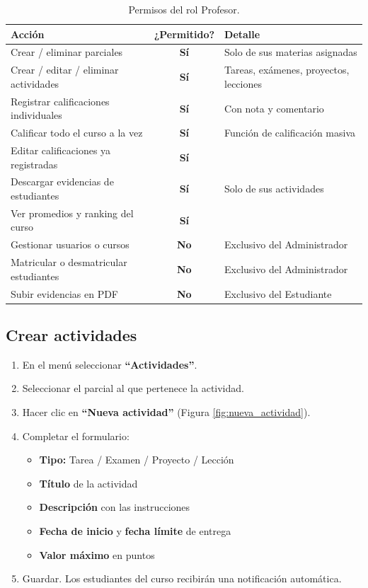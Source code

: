 \documentclass[12pt, a4paper]{article}
\newcommand{\puede}{\textcolor{yescolor}{\textbf{Sí}}}
\newcommand{\nopuede}{\textcolor{nocolor}{\textbf{No}}}
\begin{document}
\begin{table}[H]
    \centering
    \begin{tabular}{p{5.5cm} c p{6.5cm}}
        \toprule
        \textbf{Acción} & \textbf{¿Permitido?} & \textbf{Detalle} \\
        \midrule
        Crear / eliminar parciales             & \puede    & Solo de sus materias asignadas \\
        Crear / editar / eliminar actividades  & \puede    & Tareas, exámenes, proyectos, lecciones \\
        Registrar calificaciones individuales  & \puede    & Con nota y comentario \\
        Calificar todo el curso a la vez       & \puede    & Función de calificación masiva \\
        Editar calificaciones ya registradas   & \puede    & \\
        Descargar evidencias de estudiantes    & \puede    & Solo de sus actividades \\
        Ver promedios y ranking del curso      & \puede    & \\
        Gestionar usuarios o cursos            & \nopuede  & Exclusivo del Administrador \\
        Matricular o desmatricular estudiantes & \nopuede  & Exclusivo del Administrador \\
        Subir evidencias en PDF                & \nopuede  & Exclusivo del Estudiante \\
        \bottomrule
    \end{tabular}
    \caption{Permisos del rol Profesor.}
\end{table}

\subsection{Crear actividades}

\begin{enumerate}
    \item En el menú seleccionar \textbf{``Actividades''}.
    \item Seleccionar el parcial al que pertenece la actividad.
    \item Hacer clic en \textbf{``Nueva actividad''} (Figura \ref{fig:nueva_actividad}).
    \item Completar el formulario:
    \begin{itemize}
        \item \textbf{Tipo:} Tarea / Examen / Proyecto / Lección
        \item \textbf{Título} de la actividad
        \item \textbf{Descripción} con las instrucciones
        \item \textbf{Fecha de inicio} y \textbf{fecha límite} de entrega
        \item \textbf{Valor máximo} en puntos
    \end{itemize}
    \item Guardar. Los estudiantes del curso recibirán una notificación automática.
\end{enumerate}
\end{document}
